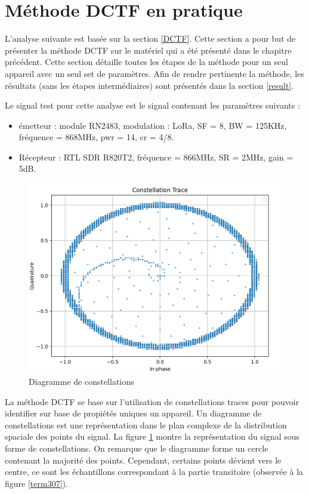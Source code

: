  
\section{Méthode DCTF en pratique}\label{pra}

L'analyse suivante est basée sur la section \ref{DCTF}. Cette section a pour but de présenter la méthode \ac{DCTF} sur le matériel qui a été présenté dans le chapitre précédent. Cette section détaille toutes les étapes de la méthode pour un seul appareil avec un seul set de paramètres. Afin de rendre pertinente la méthode, les résultats (sans les étapes intermédiaires) sont présentés dans la section \ref{result}.

Le signal test pour cette analyse est le signal contenant les paramètres suivants :

\vspace{0.1cm}

\begin{itemize}
\item émetteur : module RN2483, modulation : LoRa, SF = 8, BW = 125KHz, fréquence = 868MHz, pwr = 14, cr = 4/8.
\item Récepteur : RTL SDR R820T2, fréquence = 866MHz, SR = 2MHz, gain = 5dB.
\end{itemize}

\begin{figure}[h]
\centering

\includegraphics[scale=0.25]{images/dctf1.png}
\caption{Diagramme de constellations}\label{term314}
\end{figure}


La méthode \ac{DCTF} se base sur l'utilisation de constellations traces pour pouvoir identifier sur base de propiétés uniques un appareil. Un diagramme de constellations est une représentation dans le plan complexe de la distribution spaciale des points du signal. La figure \ref{term314} montre la représentation  du signal sous forme de constellations. On remarque que le diagramme forme un cercle contenant la majorité des points. Cependant, certains points dévient vers le centre, ce sont les échantillons correspondant à la partie transitoire (observée à la figure \ref{term307}).

